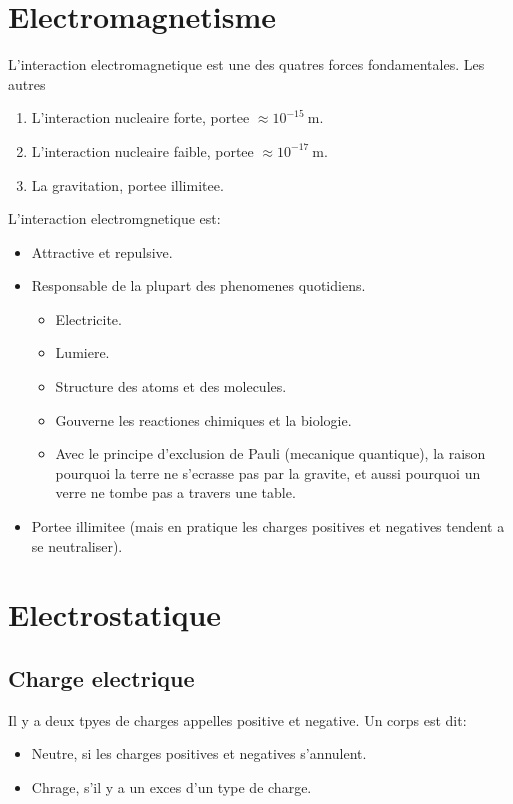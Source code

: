 
\chapter*{Electromagnetisme}

L'interaction electromagnetique est une des quatres forces fondamentales. Les autres
\begin{enumerate}
\item L'interaction nucleaire forte, portee $\approx 10^{-15}~\mathrm{m}$.
\item L'interaction nucleaire faible, portee $\approx 10^{-17}~\mathrm{m}$.
\item La gravitation, portee illimitee.
\end{enumerate}

L'interaction electromgnetique est:
\begin{itemize}
\item Attractive et repulsive.
\item Responsable de la plupart des phenomenes quotidiens.
\begin{itemize}
\item Electricite.
\item Lumiere.
\item Structure des atoms et des molecules.
\item Gouverne les reactiones chimiques et la biologie.
\item Avec le principe d'exclusion de Pauli (mecanique quantique), la raison pourquoi la terre ne s'ecrasse pas par la gravite, et aussi pourquoi un verre ne tombe pas a travers une table.
\end{itemize}
\item Portee illimitee (mais en pratique les charges positives et negatives tendent a se neutraliser).
\end{itemize}
\chapter{Electrostatique}
\section{Charge electrique}

Il y a deux tpyes de charges appelles positive et negative. Un corps est dit:
\begin{itemize}
\item Neutre, si les charges positives et negatives s'annulent.
\item Chrage, s'il y a un exces d'un type de charge.
\end{itemize}
